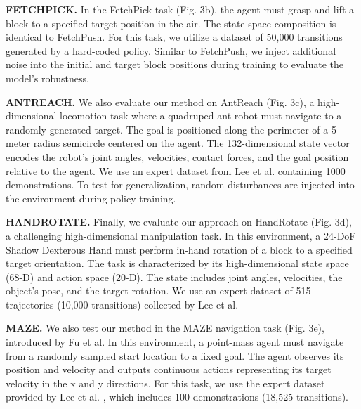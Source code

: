 \documentclass[lettersize,journal]{IEEEtran}
\begin{document}
\textbf{FETCHPICK.} In the FetchPick task (Fig. 3b), the agent must grasp and lift a block to a specified target position in the air. The state space composition is identical to FetchPush. For this task, we utilize a dataset of 50,000 transitions generated by a hard-coded policy. Similar to FetchPush, we inject additional noise into the initial and target block positions during training to evaluate the model's robustness.

\textbf{ANTREACH.} We also evaluate our method on AntReach (Fig. 3c), a high-dimensional locomotion task where a quadruped ant robot must navigate to a randomly generated target. The goal is positioned along the perimeter of a 5-meter radius semicircle centered on the agent. The 132-dimensional state vector encodes the robot's joint angles, velocities, contact forces, and the goal position relative to the agent. We use an expert dataset from Lee et al. containing 1000 demonstrations. To test for generalization, random disturbances are injected into the environment during policy training.

\textbf{HANDROTATE.} Finally, we evaluate our approach on HandRotate (Fig. 3d), a challenging high-dimensional manipulation task. In this environment, a 24-DoF Shadow Dexterous Hand must perform in-hand rotation of a block to a specified target orientation. The task is characterized by its high-dimensional state space (68-D) and action space (20-D). The state includes joint angles, velocities, the object's pose, and the target rotation. We use an expert dataset of 515 trajectories (10,000 transitions) collected by Lee et al.

\textbf{MAZE.} We also test our method in the MAZE navigation task (Fig. 3e), introduced by Fu et al. In this environment, a point-mass agent must navigate from a randomly sampled start location to a fixed goal. The agent observes its position and velocity and outputs continuous actions representing its target velocity in the x and y directions. For this task, we use the expert dataset provided by Lee et al. , which includes 100 demonstrations (18,525 transitions).
\end{document}
